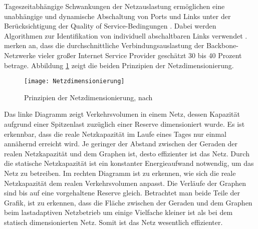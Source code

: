 Tageszeitabhängige Schwankungen der Netzauslastung ermöglichen eine unabhängige und dynamische Abschaltung von Ports und Links unter der Be\-rück\-sich\-ti\-gung der Quality of Service-Bedingungen \cite{aleksic2013}. Dabei werden Algorithmen zur Identifikation von individuell abschaltbaren Links verwendet \cite{fassnacht}. \textcite[1]{fisher} merken an, dass die durchschnittliche Verbindungsauslastung der Backbone-Netzwerke vieler großer Internet Service Provider geschätzt 30 bis 40 Prozent betrage. Abbildung \ref{fig:Netzdimensionierung} zeigt die beiden Prinzipien der Netzdimensionierung.

\begin{figure}[htb]
	\centering
	\texttt{[image: Netzdimensionierung]}
	\caption{Prinzipien der Netzdimensionierung, nach \cite{fisher}}
	\label{fig:Netzdimensionierung}
\end{figure}

Das linke Diagramm  zeigt Verkehrsvolumen in einem Netz, dessen Kapazität aufgrund einer Spitzenlast zuzüglich einer Reserve dimensioniert wurde. Es ist erkennbar, dass die reale Netzkapazität im Laufe eines Tages nur einmal annähernd erreicht wird. Je geringer der Abstand zwischen der Geraden der realen Netzkapazität und dem Graphen ist, desto effizienter ist das Netz. Durch die statische Netzkapazität ist ein konstanter Energieaufwand notwendig, um das Netz zu betreiben. 
Im rechten Diagramm  ist zu erkennen, wie sich die reale Netzkapazität dem realen Verkehrsvolumen anpasst. Die Verläufe der Graphen sind bis auf eine vorgehaltene Reserve gleich. Betrachtet man beide Teile der Grafik, ist zu erkennen, dass die Fläche zwischen der Geraden und dem Graphen beim lastadaptiven Netzbetrieb um einige Vielfache kleiner ist als bei dem statisch dimensionierten Netz. Somit ist das Netz wesentlich effizienter.

